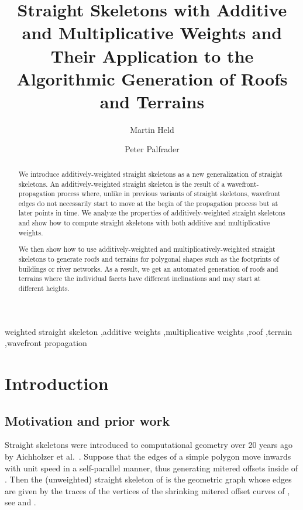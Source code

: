 \documentclass[preprint]{elsarticle}
\def\+{\discretionary{}{}{}}
\begin{document}
\begin{frontmatter}
\title{Straight Skeletons with Additive and Multiplicative Weights and Their
       Application to the Algorithmic Generation of Roofs and Terrains}


\author[sbg]{Martin Held}
\author[sbg]{Peter Palfrader}

\address[sbg]{
    Universit\"at Salzburg,
    FB Computerwissenschaften,
    5020 Salzburg, Austria;
    \texttt{\{held,\+palfrader\}@cosy.sbg.ac.at}.
}

\begin{abstract}
  We introduce additively-weighted straight skeletons as a new generalization
  of straight skeletons.  An additively-weighted straight skeleton is the
  result of a wavefront-propagation process where, unlike in previous variants
  of straight skeletons, wavefront edges do not necessarily start to move at
  the begin of the propagation process but at later points in time. We analyze
  the properties of additively-weighted straight skeletons and show how to
  compute straight skeletons with both additive and multiplicative weights.

  We then show how to use additively-weighted and multiplicatively-weighted
  straight skeletons to generate roofs and terrains for polygonal shapes such
  as the footprints of buildings or river networks. As a result, we get an
  automated generation of roofs and terrains where the individual facets have
  different inclinations and may start at different heights.
\end{abstract}

\begin{keyword}
weighted straight skeleton \sep additive weights \sep multiplicative weights
\sep roof \sep terrain \sep wavefront propagation
\end{keyword}

\end{frontmatter}

\section{Introduction}

\subsection{Motivation and prior work} \label{sec:prior_work}

Straight skeletons were introduced to computational geometry over 20
years ago by Aichholzer et al.~\cite{Aic&95}. Suppose that the edges
of a simple polygon  move inwards with unit speed in a
self-parallel manner, thus generating mitered offsets inside of .
Then the (unweighted) straight skeleton of  is the geometric graph
whose edges are given by the traces of the vertices of the shrinking
mitered offset curves of , see  and .
\end{document}
